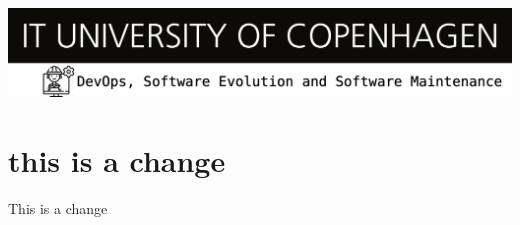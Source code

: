 \documentclass{article}
\begin{document}
  \includegraphics[width=1\linewidth]{images/devops-banner.png}
  \section{this is a change}
  This is a change
  
\end{document}
